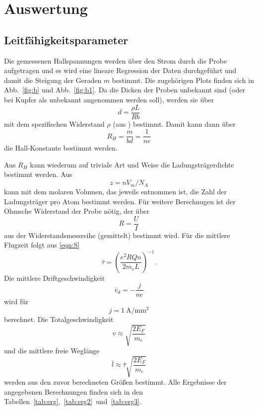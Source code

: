 \section{Auswertung}
\label{sec:Auswertung}
\subsection{Leitfähigkeitsparameter}
Die gemessenen Hallspannungen werden über den Strom durch die Probe aufgetragen und es wird eine lineare Regression der Daten durchgeführt und damit die Steigung der Geraden $m$ bestimmt. Die zugehörigen Plots finden sich in Abb.~\ref{fig:b} und Abb.~\ref{fig:b1}. Da die Dicken der Proben unbekannt sind (oder bei Kupfer als unbekannt angenommen werden soll), werden sie über \begin{equation}
  d = \frac{\rho L}{R b}
\end{equation}
mit dem spezifischen Widerstand $\rho$ (aus \cite{kkfkfkfkfkfkfkfkfkfkfkfkkfkfkfkfkkfkfkfkfkoekfoefkwpokwpoekfpowkefpowkefpowkefpowkpokwefpowkfpoewkfpowekfpoewkfpowkefpokefpowkefpowekfpoewkfpowekf}) bestimmt. Damit kann dann über \begin{equation}
  R_H = \frac{m}{bd} = \frac{1}{ne}
\end{equation}
die Hall-Konstante bestimmt werden.

Aus $R_H$ kann wiederum auf triviale Art und Weise die Ladungsträgerdichte bestimmt werden. Aus
\begin{equation}
  z = n  V_m / N_A
\end{equation}
kann mit dem molaren Volumen, das jeweils \cite{chemie.de} entnommen ist, die Zahl der Ladungsträger pro Atom bestimmt werden. Für weitere Berechnugen ist der Ohmsche Widerstand der Probe nötig, der über
\begin{equation}
  R = \frac{U}{I}
\end{equation}
aus der Widerstandsmessreihe (gemittelt) bestimmt wird. Für die mittlere Flugzeit folgt aus \eqref{eqn:S}
\begin{equation}
  \bar\tau = \left(\frac{e^2 R Q n}{2 m_e L}\right)^{-1}.
\end{equation}
Die mittlere Driftgeschwindigkeit
\begin{equation}
  \bar v_d = -\frac{j}{ne}
\end{equation}
wird für
\begin{equation}
  j = \SI{1}{\ampere\per\milli\meter\squared}
\end{equation}
berechnet.
Die Totalgeschwindigkeit
\begin{equation}
  v \approx \sqrt{\frac{2 E_F}{m_e}}
\end{equation}
und die mittlere freie Weglänge
\begin{equation}
  \bar l \approx \bar \tau \sqrt{\frac{2 E_F}{m_e}}
\end{equation}
werden aus den zuvor berechneten Größen bestimmt. Alle Ergebnisse der angegebenen Berechnungen finden sich in den Tabellen~\ref{tab:erg},~\ref{tab:erg2}~und~\ref{tab:erg3}.



\FloatBarrier
